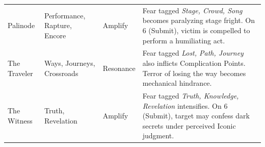 \begin{longtable}{@{}p{3.2cm}p{4.5cm}p{2.8cm}p{5.9cm}@{}}
Palinode & Performance, Rapture, Encore & Amplify & 
Fear tagged \emph{Stage, Crowd, Song} becomes paralyzing stage fright. On 6 (Submit), victim is compelled to perform a humiliating act. \\

The Traveler & Ways, Journeys, Crossroads & Resonance & 
Fear tagged \emph{Lost, Path, Journey} also inflicts Complication Points. Terror of losing the way becomes mechanical hindrance. \\

The Witness & Truth, Revelation & Amplify & 
Fear tagged \emph{Truth, Knowledge, Revelation} intensifies. On 6 (Submit), target may confess dark secrets under perceived Iconic judgment. \\

\end{longtable}


